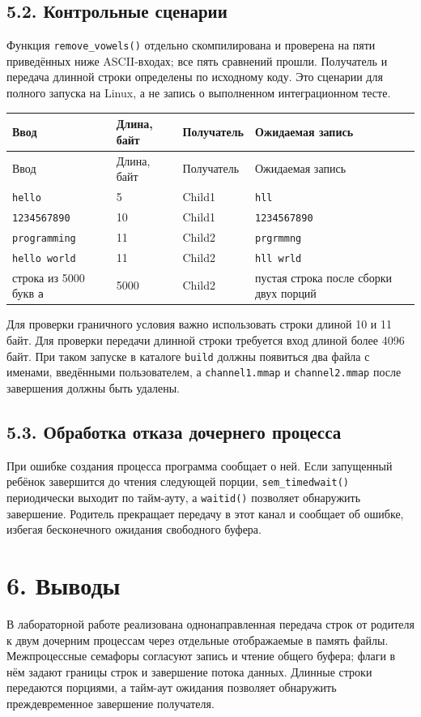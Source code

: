 \documentclass[12pt,a4paper]{article}
\begin{document}
\subsection*{5.2. Контрольные сценарии}
Функция \texttt{remove\_vowels()} отдельно скомпилирована и проверена на пяти приведённых ниже ASCII-входах; все пять сравнений прошли. Получатель и передача длинной строки определены по исходному коду. Это сценарии для полного запуска на Linux, а не запись о выполненном интеграционном тесте.

\begin{longtable}{|p{3.3cm}|p{1.7cm}|p{2.5cm}|p{6.0cm}|}
\hline
Ввод & Длина, байт & Получатель & Ожидаемая запись \\
\hline
\endfirsthead
\hline
Ввод & Длина, байт & Получатель & Ожидаемая запись \\
\hline
\endhead
\texttt{hello} & 5 & Child1 & \texttt{hll} \\
\hline
\texttt{1234567890} & 10 & Child1 & \texttt{1234567890} \\
\hline
\texttt{programming} & 11 & Child2 & \texttt{prgrmmng} \\
\hline
\texttt{hello world} & 11 & Child2 & \texttt{hll wrld} \\
\hline
строка из 5000 букв \texttt{a} & 5000 & Child2 & пустая строка после сборки двух порций \\
\hline
\end{longtable}
Для проверки граничного условия важно использовать строки длиной 10 и 11 байт. Для проверки передачи длинной строки требуется вход длиной более 4096 байт. При таком запуске в каталоге \texttt{build} должны появиться два файла с именами, введёнными пользователем, а \texttt{channel1.mmap} и \texttt{channel2.mmap} после завершения должны быть удалены.

\subsection*{5.3. Обработка отказа дочернего процесса}
При ошибке создания процесса программа сообщает о ней. Если запущенный ребёнок завершится до чтения следующей порции, \texttt{sem\_timedwait()} периодически выходит по тайм-ауту, а \texttt{waitid()} позволяет обнаружить завершение. Родитель прекращает передачу в этот канал и сообщает об ошибке, избегая бесконечного ожидания свободного буфера.

\section*{6. Выводы}
В лабораторной работе реализована однонаправленная передача строк от родителя к двум дочерним процессам через отдельные отображаемые в память файлы. Межпроцессные семафоры согласуют запись и чтение общего буфера; флаги в нём задают границы строк и завершение потока данных. Длинные строки передаются порциями, а тайм-аут ожидания позволяет обнаружить преждевременное завершение получателя.
\end{document}
